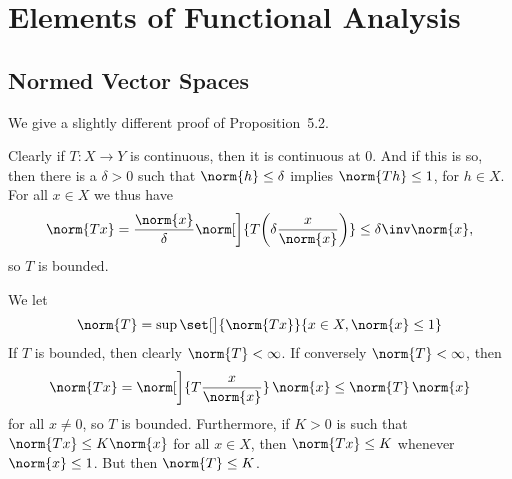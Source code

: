\documentclass[article, a4paper, 11pt, oneside]{memoir}
\numberwithin{equation}{chapter}
\theoremstyle{nonumberplain}
\begin{document}
\chapter{Elements of Functional Analysis}

\section{Normed Vector Spaces}

\begin{remark}
	We give a slightly different proof of Proposition~5.2.

	Clearly if $T \colon X \to Y$ is continuous, then it is continuous at $0$. And if this is so, then there is a $\delta > 0$ such that $\norm{h} \leq \delta$ implies $\norm{Th} \leq 1$, for $h \in X$. For all $x \in X$ we thus have
	\begin{equation*}
		\norm{Tx}
			= \frac{\norm{x}}{\delta} \norm[\bigg]{T \biggl( \delta \frac{x}{\norm{x}} \biggr) }
			\leq \delta\inv \norm{x},
	\end{equation*}
	so $T$ is bounded.

	We let
	\begin{equation*}
		\norm{T}
			= \sup \set[\big]{\norm{Tx}}{x \in X, \norm{x} \leq 1}
	\end{equation*}
	If $T$ is bounded, then clearly $\norm{T} < \infty$. If conversely $\norm{T} < \infty$, then
	\begin{equation*}
		\norm{Tx}
			= \norm[\bigg]{T \frac{x}{\norm{x}} } \, \norm{x}
			\leq \norm{T} \, \norm{x}
	\end{equation*}
	for all $x \neq 0$, so $T$ is bounded. Furthermore, if $K > 0$ is such that $\norm{Tx} \leq K \norm{x}$ for all $x \in X$, then $\norm{Tx} \leq K$ whenever $\norm{x} \leq 1$. But then $\norm{T} \leq K$.
\end{remark}
\end{document}
